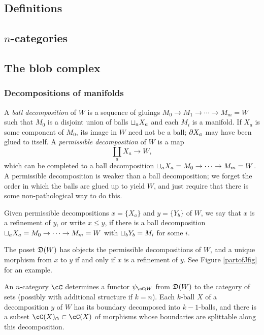 \documentclass{pnastwo}
\begin{document}
\begin{article}
\section{Definitions}
\subsection{$n$-categories}
\subsection{The blob complex}
\subsubsection{Decompositions of manifolds}

A \emph{ball decomposition} of $W$ is a 
sequence of gluings $M_0\to M_1\to\cdots\to M_m = W$ such that $M_0$ is a disjoint union of balls
$\sqcup_a X_a$ and each $M_i$ is a manifold.
If $X_a$ is some component of $M_0$, its image in $W$ need not be a ball; $\partial X_a$ may have been glued to itself.
A {\it permissible decomposition} of $W$ is a map
\[
	\coprod_a X_a \to W,
\]
which can be completed to a ball decomposition $\sqcup_a X_a = M_0\to\cdots\to M_m = W$.
A permissible decomposition is weaker than a ball decomposition; we forget the order in which the balls
are glued up to yield $W$, and just require that there is some non-pathological way to do this.

Given permissible decompositions $x = \{X_a\}$ and $y = \{Y_b\}$ of $W$, we say that $x$ is a refinement
of $y$, or write $x \le y$, if there is a ball decomposition $\sqcup_a X_a = M_0\to\cdots\to M_m = W$
with $\sqcup_b Y_b = M_i$ for some $i$.

\begin{defn}
The poset $\mathfrak{D}(W)$ has objects the permissible decompositions of $W$, 
and a unique morphism from $x$ to $y$ if and only if $x$ is a refinement of $y$.
See Figure \ref{partofJfig} for an example.
\end{defn}


An $n$-category $\cC$ determines 
a functor $\psi_{\cC;W}$ from $\mathfrak{D}(W)$ to the category of sets 
(possibly with additional structure if $k=n$).
Each $k$-ball $X$ of a decomposition $y$ of $W$ has its boundary decomposed into $k{-}1$-balls,
and there is a subset $\cC(X)\spl \sub \cC(X)$ of morphisms whose boundaries
are splittable along this decomposition.


\end{article}
\end{document}
